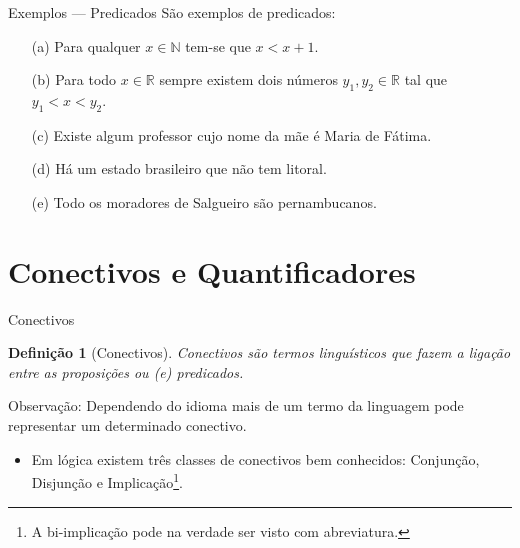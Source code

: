 \documentclass[aspectratio=169]{beamer}
\newtheorem{defi}{Definição}
\begin{document}
	\begin{frame}{Exemplos --- Predicados}
		São exemplos de predicados:
		\begin{itemize}
			\item[(a)] Para qualquer $x \in \mathbb{N}$ tem-se que $x < x + 1$.
			\item[(b)] Para todo $x \in \mathbb{R}$ sempre existem dois números $y_1, y_2 \in \mathbb{R}$ tal que $y_1 < x < y_2$.
			\item[(c)] Existe algum professor cujo nome da mãe é Maria de Fátima.
			\item[(d)] Há um estado brasileiro que não tem litoral.
			\item[(e)] Todo os moradores de Salgueiro são pernambucanos.
		\end{itemize}
	\end{frame}

	\section{Conectivos e Quantificadores}
	
	\begin{frame}{Conectivos}
		\begin{defi}[Conectivos]\label{def:Conectivos}
			Conectivos são termos linguísticos que fazem a ligação entre as proposições ou (e) predicados.
		\end{defi}
		\pause
		\begin{alertblock}{Observação:}
			Dependendo do idioma mais de um termo da linguagem pode representar um determinado conectivo.
		\end{alertblock}
		\pause
		\begin{itemize}
			\item Em lógica existem três classes de conectivos bem conhecidos: Conjunção, Disjunção e Implicação\footnote{A bi-implicação pode na verdade ser visto com abreviatura.}.
		\end{itemize}
	\end{frame}
\end{document}
